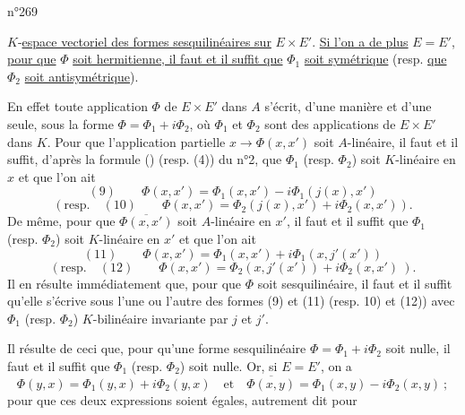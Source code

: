 \hfill n°269

$K$-\uline{espace vectoriel des formes sesquilinéaires sur} $E\times E'$. \uline{Si l'on a de plus} $E=E'$, \uline{pour que} $\Phi$ \uline{soit hermitienne, il faut et il suffit que} $\Phi_1$ \uline{soit symétrique} (resp. \uline{que} $\Phi_2$ \uline{soit antisymétrique}).

En effet toute application $\Phi$ de $E\times E'$ dans $A$ s'écrit, d'une manière et d'une seule, sous la forme $\Phi=\Phi_1+i\Phi_2$, où $\Phi_1$ et $\Phi_2$ sont des applications de $E\times E'$ dans $K$. Pour que l'application partielle $x\longrightarrow\Phi(x,x')$ soit $A$-linéaire, il faut et il suffit, d'après la formule () (resp. (4)) du n°2, que $\Phi_1$ (resp. $\Phi_2$) soit $K$-linéaire en $x$ et que l'on ait
\[
(9)\qquad\Phi(x,x')=\Phi_1(x,x')-i\Phi_1(j(x),x')
\]
\[
(\text{resp.}\quad(10)\qquad\Phi(x,x')=\Phi_2(j(x),x')+i\Phi_2(x,x')).
\]
De même, pour que $\overline{\Phi(x,x')}$ soit $A$-linéaire en $x'$, il faut et il suffit que $\Phi_1$ (resp. $\Phi_2$) soit $K$-linéaire en $x'$ et que l'on ait
\[
(11)\qquad\Phi(x,x')=\Phi_1(x,x')+i\Phi_1(x,j'(x'))
\]
\[
(\text{resp.}\quad(12)\qquad\Phi(x,x')=\Phi_2(x,j'(x'))+i\Phi_2(x,x')\ ).
\]
Il en résulte immédiatement que, pour que $\Phi$ soit sesquilinéaire, il faut et il suffit qu'elle s'écrive sous l'une ou l'autre des formes (9) et (11) (resp. 10) et (12)) avec $\Phi_1$ (resp. $\Phi_2$) $K$-bilinéaire invariante par $j$ et $j'$.

Il résulte de ceci que, pour qu'une forme sesquilinéaire $\Phi=\Phi_1+i\Phi_2$ soit nulle, il faut et il suffit que $\Phi_1$ (resp. $\Phi_2$) soit nulle. Or, si $E=E'$, on a
\[
\Phi(y,x)=\Phi_1(y,x)+i\Phi_2(y,x)\quad\text{et}\quad\overline{\Phi(x,y)}=\Phi_1(x,y)-i\Phi_2(x,y)\ ;
\]
pour que ces deux expressions soient égales, autrement dit pour
